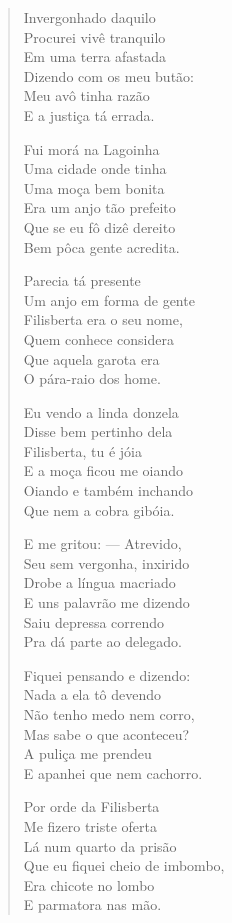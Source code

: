 \begin{verse}
Invergonhado daquilo\\
Procurei vivê tranquilo\\
Em uma terra afastada\\
Dizendo com os meu butão:\\
Meu avô tinha razão\\
E a justiça tá errada.

Fui morá na Lagoinha\\
Uma cidade onde tinha\\
Uma moça bem bonita\\
Era um anjo tão prefeito\\
Que se eu fô dizê dereito\\
Bem pôca gente acredita.

Parecia tá presente\\
Um anjo em forma de gente\\
Filisberta era o seu nome,\\
Quem conhece considera\\
Que aquela garota era\\
O pára-raio dos home.

Eu vendo a linda donzela\\
Disse bem pertinho dela\\
Filisberta, tu é jóia\\
E a moça ficou me oiando\\
Oiando e também inchando\\
Que nem a cobra gibóia.

E me gritou: --- Atrevido,\\
Seu sem vergonha, inxirido\\
Drobe a língua macriado\\
E uns palavrão me dizendo\\
Saiu depressa correndo\\
Pra dá parte ao delegado.

Fiquei pensando e dizendo:\\
Nada a ela tô devendo\\
Não tenho medo nem corro,\\
Mas sabe o que aconteceu?\\
A puliça me prendeu\\
E apanhei que nem cachorro.

Por orde da Filisberta\\
Me fizero triste oferta\\
Lá num quarto da prisão\\
Que eu fiquei cheio de imbombo,\\
Era chicote no lombo\\
E parmatora nas mão.


\end{verse}
